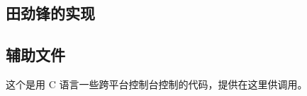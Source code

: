 \subsection{田劲锋的实现}
{\linespread{1}}
{\linespread{1}}
{\linespread{1}}

\subsection{辅助文件}
这个是用 C 语言一些跨平台控制台控制的代码，提供在这里供调用。
{\linespread{1}}
{\linespread{1}}


